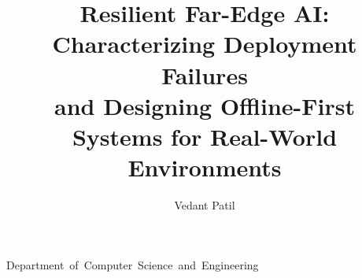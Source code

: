 \documentclass[ms]{osudissert96}
\begin{document}
%
%

\author{Vedant Patil}
\title{Resilient Far-Edge AI: Characterizing Deployment Failures\\[0.3em]
and Designing Offline-First Systems for Real-World Environments}
\unit{Department of Computer Science and Engineering}



%
%

\maketitle

%
%
%
%
%

\disscopyright

%
%

\begin{abstract}
  
\end{abstract}


%
%
%
\end{document}
